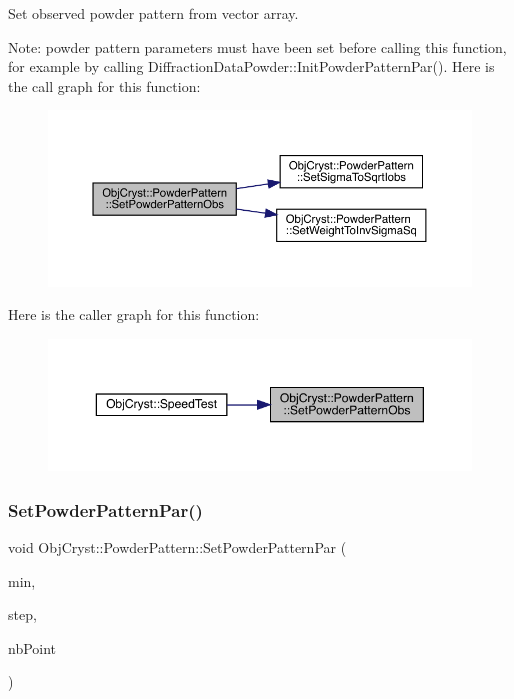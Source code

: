 Set observed powder pattern from vector array. 

Note\+: powder pattern parameters must have been set before calling this function, for example by calling Diffraction\+Data\+Powder\+::\+Init\+Powder\+Pattern\+Par(). Here is the call graph for this function\+:
\nopagebreak
\begin{figure}[H]
\begin{center}
\leavevmode
\includegraphics[width=350pt]{class_obj_cryst_1_1_powder_pattern_a8562e190d277379e6e18d43f3d616976_cgraph}
\end{center}
\end{figure}
Here is the caller graph for this function\+:
\nopagebreak
\begin{figure}[H]
\begin{center}
\leavevmode
\includegraphics[width=350pt]{class_obj_cryst_1_1_powder_pattern_a8562e190d277379e6e18d43f3d616976_icgraph}
\end{center}
\end{figure}
\mbox{\label{class_obj_cryst_1_1_powder_pattern_adb92497ec0c6793c1cb74fc1bf9914e2}} 
\subsubsection{\texorpdfstring{SetPowderPatternPar()}{SetPowderPatternPar()}}
{\footnotesize\ttfamily void Obj\+Cryst\+::\+Powder\+Pattern\+::\+Set\+Powder\+Pattern\+Par (\begin{DoxyParamCaption}\item[{const R\+E\+AL}]{min,  }\item[{const R\+E\+AL}]{step,  }\item[{unsigned long}]{nb\+Point }\end{DoxyParamCaption})}

